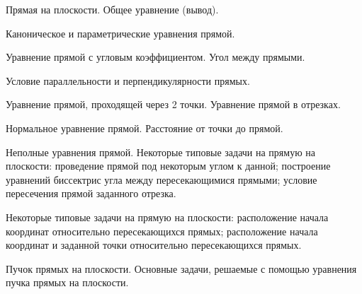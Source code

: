\begin{question}
Прямая на плоскости. Общее уравнение (вывод).
\end{question}
\begin{question}
Каноническое и параметрические уравнения прямой.
\end{question}
\begin{question}
Уравнение прямой с угловым коэффициентом. Угол между прямыми.
\end{question}
\begin{question}
Условие параллельности и перпендикулярности прямых.
\end{question}
\begin{question}
Уравнение прямой, проходящей через 2 точки. Уравнение прямой в
отрезках.
\end{question}
\begin{question}
Нормальное уравнение прямой. Расстояние от точки до прямой.
\end{question}
\begin{question}
Неполные уравнения прямой. Некоторые типовые задачи на прямую на
плоскости: проведение прямой под некоторым углом к данной;
построение уравнений биссектрис угла между пересекающимися
прямыми; условие пересечения прямой заданного отрезка.
\end{question}
\begin{question}
Некоторые типовые задачи на прямую на плоскости: расположение начала
координат относительно пересекающихся прямых; расположение начала
координат и заданной точки относительно пересекающихся прямых.
\end{question}
\begin{question}
Пучок прямых на плоскости. Основные задачи, решаемые с помощью
уравнения пучка прямых на плоскости.
\end{question}